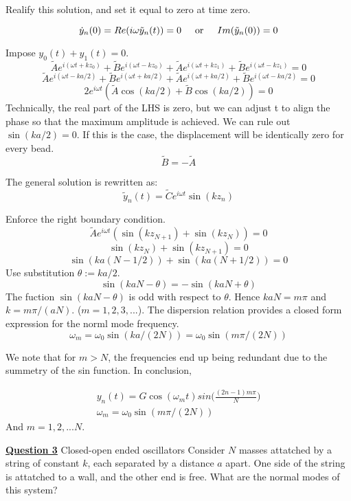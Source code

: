 \documentclass{article}
\newcommand{\new}[1]{
    \vspace{2mm}
    \noindent
    \textbf{
    \underline{#1}}
}
\newcommand{\textOr}{
    {
        \hspace{5mm}
        \textrm{or}
        \hspace{5mm}
    }
}
\newcommand{\Ixp}[1]{
    {
        e^{i{#1}}
    }
}
\begin{document}
Realify this solution, and set it equal to zero at time zero. 

\[
    \dot{y}_n(0) = Re(i\omega \tilde{y}_n(t)) = 0
    \textOr 
    Im(\tilde{y}_n(0)) = 0
\]


Impose $y_0(t) + y_1(t) = 0$. 
\[
     \tilde{A}\Ixp{(\omega t + kz_0)}
    + \tilde{B}\Ixp{(\omega t - kz_0)} 
    +
 \tilde{A}\Ixp{(\omega t + kz_1)}
    + \tilde{B}\Ixp{(\omega t - kz_1)}
    = 0 
\]
\[
     \tilde{A}\Ixp{(\omega t -ka/2)}
    + \tilde{B}\Ixp{(\omega t +ka/2)} 
    +
 \tilde{A}\Ixp{(\omega t + ka/2)}
    + \tilde{B}\Ixp{(\omega t - ka/2)}
    = 0 
\]
\[
    2\Ixp{\omega t} (
        \tilde{A} \cos (ka/2)
        + \tilde{B} \cos (ka/2)
    )
    = 0
\]
Technically, the real part of the LHS is zero, but we 
can adjust t to align the phase so that the maximum amplitude is 
achieved. 
We can rule out $\sin(ka/2) = 0$. If this is the case, 
the displacement will be identically zero for every bead. 
\[
    \tilde{B} = -\tilde{A}
\]

The general solution is rewritten as:
\[
    \tilde{y}_n(t) = \tilde{C} \Ixp{\omega t} \sin(kz_n)
\]

Enforce the right boundary condition. 
\[
    \tilde{A} \Ixp{\omega t} (\sin(kz_{N + 1}) + \sin(kz_N)) = 0
\]
\[
    \sin(kz_N) + \sin(kz_{N + 1}) = 0
\]
\[
    \sin(ka(N -1/2)) +  \sin(ka(N +1/2)) = 0 
\]
Use substitution $\theta:= ka/2$. 
\[
    \sin(kaN- \theta) = -\sin(kaN + \theta)
\]
The fuction $\sin(kaN - \theta)$ is odd with respect 
to $\theta$. Hence $kaN = m\pi$ and $k = m\pi/(aN)$. 
($m = 1, 2, 3, ...$). The dispersion relation provides 
a closed form expression for the norml mode frequency. 
\[
    \omega_m = \omega_0 \sin(ka/(2N)) = \omega_0 \sin(m\pi/(2N))
\]

We note that for $m > N$, the frequencies end up being redundant 
due to the summetry of the sin function. In conclusion, 

\begin{align*}
    \boxed{
    y_n(t) = G\cos(\omega_m t)sin\bigg(\frac{(2n - 1)m \pi}{N}\bigg)}\\
    \boxed{
    \omega_m = \omega_0 \sin(m\pi/(2N))
    }
\end{align*}
And $m = 1, 2, ... N$. 

\newpage

\new{Question 3} Closed-open ended oscillators 
Consider $N$ masses attatched by a string of constant $k$, 
each separated by a distance $a$ apart. One side of the 
string is attatched to a wall, and the other end is free. 
What are the normal modes of this system?
\end{document}
